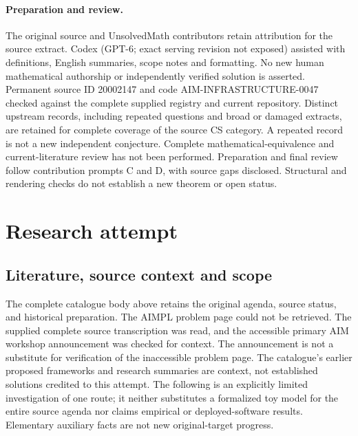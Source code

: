 \documentclass[11pt]{article}
\begin{document}
\paragraph{Preparation and review.}
The original source and UnsolvedMath contributors retain attribution for the source extract. Codex (GPT-6; exact serving revision not exposed) assisted with definitions, English summaries, scope notes and formatting. No new human mathematical authorship or independently verified solution is asserted. Permanent source ID 20002147 and code AIM-INFRASTRUCTURE-0047 checked against the complete supplied registry and current repository. Distinct upstream records, including repeated questions and broad or damaged extracts, are retained for complete coverage of the source CS category. A repeated record is not a new independent conjecture. Complete mathematical-equivalence and current-literature review has not been performed. Preparation and final review follow contribution prompts C and D, with source gaps disclosed. Structural and rendering checks do not establish a new theorem or open status.
\label{end:20002147}

\section{Research attempt}
\subsection{Literature, source context and scope}
The complete catalogue body above retains the original agenda, source status, and historical preparation. The AIMPL problem page could not be retrieved. The supplied complete source transcription was read, and the accessible primary AIM workshop announcement was checked for context. The announcement is not a substitute for verification of the inaccessible problem page. The catalogue's earlier proposed frameworks and research summaries are context, not established solutions credited to this attempt. The following is an explicitly limited investigation of one route; it neither substitutes a formalized toy model for the entire source agenda nor claims empirical or deployed-software results. Elementary auxiliary facts are not new original-target progress.
\end{document}
